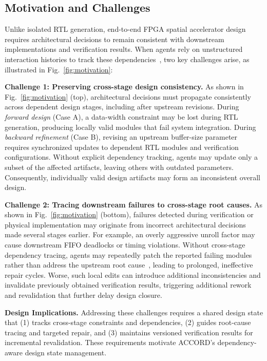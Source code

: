 \documentclass[9pt,conference]{IEEEtran}
\begin{document}
\subsection{Motivation and Challenges}
Unlike isolated RTL generation, end-to-end FPGA spatial accelerator design requires architectural decisions to remain consistent with downstream implementations and verification results. When agents rely on unstructured interaction histories to track these dependencies~\cite{lostmiddle,longbench,locomo}, two key challenges arise, as illustrated in Fig.~\ref{fig:motivation}:

\textbf{Challenge 1: Preserving cross-stage design consistency.}
As shown in Fig.~\ref{fig:motivation} (top), architectural decisions must propagate consistently across dependent design stages, including after upstream revisions. During \emph{forward design} (Case A), a data-width constraint may be lost during RTL generation, producing locally valid modules that fail system integration. During \emph{backward refinement} (Case B), revising an upstream buffer-size parameter requires synchronized updates to dependent RTL modules and verification configurations. Without explicit dependency tracking, agents may update only a subset of the affected artifacts, leaving others with outdated parameters. Consequently, individually valid design artifacts may form an inconsistent overall design.

\textbf{Challenge 2: Tracing downstream failures to cross-stage root causes.}
As shown in Fig.~\ref{fig:motivation} (bottom), failures detected during verification or physical implementation may originate from incorrect architectural decisions made several stages earlier. For example, an overly aggressive unroll factor may cause downstream FIFO deadlocks or timing violations. Without cross-stage dependency tracing, agents may repeatedly patch the reported failing modules rather than address the upstream root cause~\cite{swesearch}, leading to prolonged, ineffective repair cycles. Worse, such local edits can introduce additional inconsistencies and invalidate previously obtained verification results, triggering additional rework and revalidation that further delay design closure.

\textbf{Design Implications.}
Addressing these challenges requires a shared design state that (1) tracks cross-stage constraints and dependencies, (2) guides root-cause tracing and targeted repair, and (3) maintains versioned verification results for incremental revalidation. These requirements motivate ACCORD's dependency-aware design state management.
\end{document}
